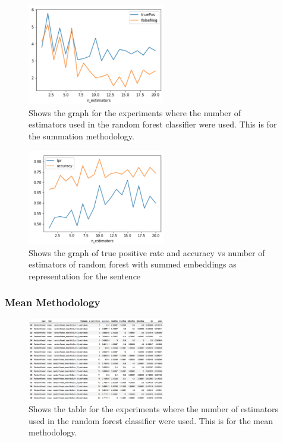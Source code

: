 \documentclass[twoside,twocolumn]{article}
\begin{document}
\begin{figure}[H]
\includegraphics[width=6cm]{randForest_estimators_summed_graph}
\centering
\caption{Shows the graph for the experiments where the number of estimators used
in the random forest classifier were used. This is for the summation methodology.}
\end{figure}

\begin{figure}[H]
\includegraphics[width=6cm]{randForest_estimators_summed_graph-tpr}
\centering
\caption{Shows the graph of true positive rate and accuracy vs number of estimators of random forest 
with summed embeddings as representation for the sentence}
\end{figure}


\subsubsection{Mean Methodology}

\begin{figure}[H]
\includegraphics[width=6cm]{randForest_estimators_meaned_table}
\centering
\caption{Shows the table for the experiments where the number of estimators used
in the random forest classifier were used. This is for the mean methodology.}
\end{figure}
\end{document}
